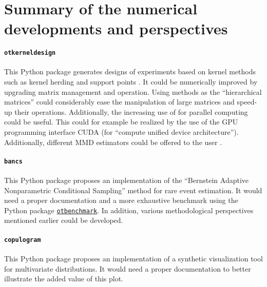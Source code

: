 \section*{Summary of the numerical developments and perspectives}

\paragraph{\texttt{otkerneldesign}}
This Python package generates designs of experiments based on kernel methods such as kernel herding \citep{chen_2018_owt_diagram} and support points \citep{mak_joseph_2018}. 
It could be numerically improved by upgrading matrix management and operation. 
Using methods as the ``hierarchical matrices'' \citep{borm_2003_hmat} could considerably ease the manipulation of large matrices and speed-up their operations.  
Additionally, the increasing use of  for parallel computing could be useful. 
This could for example be realized by the use of the GPU programming interface CUDA (for ``compute unified device architecture''). 
Additionally, different MMD estimators could be offered to the user \citep{gretton_2006}. 


\paragraph{\texttt{bancs}}
This Python package proposes an implementation of the ``Bernstein Adaptive Nonparametric Conditional Sampling'' method for rare event estimation. 
It would need a proper documentation and a more exhaustive benchmark using the Python package \href{https://github.com/mbaudin47/otbenchmark/}{\texttt{otbenchmark}}\footnotemark. 
In addition, various methodological perspectives mentioned earlier could be developed. 


\paragraph{\texttt{copulogram}}
This Python package proposes an implementation of a synthetic visualization tool for multivariate distributions. 
It would need a proper documentation to better illustrate the added value of this plot. 

